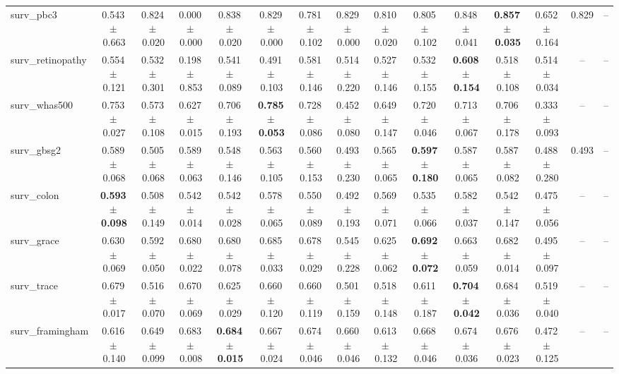\documentclass[8pt]{extarticle}
\begin{document}
\begin{longtable}{l*{14}{c}}
surv\_pbc3 & 0.543\,$\pm$\,0.663 & 0.824\,$\pm$\,0.020 & 0.000\,$\pm$\,0.000 & 0.838\,$\pm$\,0.020 & 0.829\,$\pm$\,0.000 & 0.781\,$\pm$\,0.102 & 0.829\,$\pm$\,0.000 & 0.810\,$\pm$\,0.020 & 0.805\,$\pm$\,0.102 & 0.848\,$\pm$\,0.041 & \textbf{0.857\,$\pm$\,0.035} & 0.652\,$\pm$\,0.164 & 0.829 & -- \\
surv\_retinopathy & 0.554\,$\pm$\,0.121 & 0.532\,$\pm$\,0.301 & 0.198\,$\pm$\,0.853 & 0.541\,$\pm$\,0.089 & 0.491\,$\pm$\,0.103 & 0.581\,$\pm$\,0.146 & 0.514\,$\pm$\,0.220 & 0.527\,$\pm$\,0.146 & 0.532\,$\pm$\,0.155 & \textbf{0.608\,$\pm$\,0.154} & 0.518\,$\pm$\,0.108 & 0.514\,$\pm$\,0.034 & -- & -- \\
surv\_whas500 & 0.753\,$\pm$\,0.027 & 0.573\,$\pm$\,0.108 & 0.627\,$\pm$\,0.015 & 0.706\,$\pm$\,0.193 & \textbf{0.785\,$\pm$\,0.053} & 0.728\,$\pm$\,0.086 & 0.452\,$\pm$\,0.080 & 0.649\,$\pm$\,0.147 & 0.720\,$\pm$\,0.046 & 0.713\,$\pm$\,0.067 & 0.706\,$\pm$\,0.178 & 0.333\,$\pm$\,0.093 & -- & -- \\
surv\_gbsg2 & 0.589\,$\pm$\,0.068 & 0.505\,$\pm$\,0.068 & 0.589\,$\pm$\,0.063 & 0.548\,$\pm$\,0.146 & 0.563\,$\pm$\,0.105 & 0.560\,$\pm$\,0.153 & 0.493\,$\pm$\,0.230 & 0.565\,$\pm$\,0.065 & \textbf{0.597\,$\pm$\,0.180} & 0.587\,$\pm$\,0.065 & 0.587\,$\pm$\,0.082 & 0.488\,$\pm$\,0.280 & 0.493 & -- \\
surv\_colon & \textbf{0.593\,$\pm$\,0.098} & 0.508\,$\pm$\,0.149 & 0.542\,$\pm$\,0.014 & 0.542\,$\pm$\,0.028 & 0.578\,$\pm$\,0.065 & 0.550\,$\pm$\,0.089 & 0.492\,$\pm$\,0.193 & 0.569\,$\pm$\,0.071 & 0.535\,$\pm$\,0.066 & 0.582\,$\pm$\,0.037 & 0.542\,$\pm$\,0.147 & 0.475\,$\pm$\,0.056 & -- & -- \\
surv\_grace & 0.630\,$\pm$\,0.069 & 0.592\,$\pm$\,0.050 & 0.680\,$\pm$\,0.022 & 0.680\,$\pm$\,0.078 & 0.685\,$\pm$\,0.033 & 0.678\,$\pm$\,0.029 & 0.545\,$\pm$\,0.228 & 0.625\,$\pm$\,0.062 & \textbf{0.692\,$\pm$\,0.072} & 0.663\,$\pm$\,0.059 & 0.682\,$\pm$\,0.014 & 0.495\,$\pm$\,0.097 & -- & -- \\
surv\_trace & 0.679\,$\pm$\,0.017 & 0.516\,$\pm$\,0.070 & 0.670\,$\pm$\,0.069 & 0.625\,$\pm$\,0.029 & 0.660\,$\pm$\,0.120 & 0.660\,$\pm$\,0.119 & 0.501\,$\pm$\,0.159 & 0.518\,$\pm$\,0.148 & 0.611\,$\pm$\,0.187 & \textbf{0.704\,$\pm$\,0.042} & 0.684\,$\pm$\,0.036 & 0.519\,$\pm$\,0.040 & -- & -- \\
surv\_framingham & 0.616\,$\pm$\,0.140 & 0.649\,$\pm$\,0.099 & 0.683\,$\pm$\,0.008 & \textbf{0.684\,$\pm$\,0.015} & 0.667\,$\pm$\,0.024 & 0.674\,$\pm$\,0.046 & 0.660\,$\pm$\,0.046 & 0.613\,$\pm$\,0.132 & 0.668\,$\pm$\,0.046 & 0.674\,$\pm$\,0.036 & 0.676\,$\pm$\,0.023 & 0.472\,$\pm$\,0.125 & -- & -- \\

\end{longtable}
\end{document}
